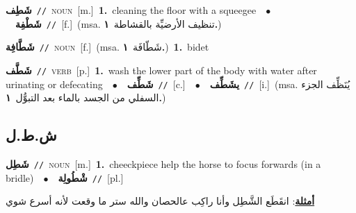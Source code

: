 \documentclass[10pt,a4paper,twoside]{article} %
\begin{document}
\begin{multicols}{2}
{\setlength\topsep{0pt}\textbf{\foreignlanguage{arabic}{شَطِف}}\ {\color{gray}\texttt{//}\color{black}}\ \textsc{noun}\ [m.]\ \textbf{1.}~cleaning the floor with a squeegee\ \ $\bullet$\ \ \setlength\topsep{0pt}\textbf{\foreignlanguage{arabic}{شَطْفِة}}\ {\color{gray}\texttt{//}\color{black}}\ [f.]\ \color{gray}(msa. \foreignlanguage{arabic}{تنظيف الأرضيِّة بالقشاطة}~\foreignlanguage{arabic}{\textbf{١.}})\color{black}\ } \vspace{2mm}

{\setlength\topsep{0pt}\textbf{\foreignlanguage{arabic}{شَطَّافِة}}\ {\color{gray}\texttt{//}\color{black}}\ \textsc{noun}\ [f.]\ \color{gray}(msa. \foreignlanguage{arabic}{شَطّافَة}~\foreignlanguage{arabic}{\textbf{١.}})\color{black}\ \textbf{1.}~bidet\ } \vspace{2mm}

{\setlength\topsep{0pt}\textbf{\foreignlanguage{arabic}{شَطَّف}}\ {\color{gray}\texttt{//}\color{black}}\ \textsc{verb}\ [p.]\ \textbf{1.}~wash the lower part of the body with water after urinating or defecating\ \ $\bullet$\ \ \setlength\topsep{0pt}\textbf{\foreignlanguage{arabic}{شَطِّف}}\ {\color{gray}\texttt{//}\color{black}}\ [c.]\ \ $\bullet$\ \ \setlength\topsep{0pt}\textbf{\foreignlanguage{arabic}{يشَطِّف}}\ {\color{gray}\texttt{//}\color{black}}\ [i.]\ \color{gray}(msa. \foreignlanguage{arabic}{يُنَظِّف الجزء السفلي من الجسد بالماء بعد التبوُّل}~\foreignlanguage{arabic}{\textbf{١.}})\color{black}\ } \vspace{2mm}

\vspace{-3mm}
\subsection*{\color{blue}\foreignlanguage{arabic}{ش.ط.ل}\color{blue}{}} 

{\setlength\topsep{0pt}\textbf{\foreignlanguage{arabic}{شَطِل}}\ {\color{gray}\texttt{//}\color{black}}\ \textsc{noun}\ [m.]\ \textbf{1.}~cheeckpiece help the horse to focus forwards (in a bridle)\ \ $\bullet$\ \ \setlength\topsep{0pt}\textbf{\foreignlanguage{arabic}{شْطُولِة}}\ {\color{gray}\texttt{//}\color{black}}\ [pl.]\  \begin{flushright}\color{gray}\foreignlanguage{arabic}{\textbf{\underline{\foreignlanguage{arabic}{أمثلة}}}: انقَطَع الشَّطِل وأنا راكِب عالحصان والله ستر ما وقعت لأنه أسرع شوي}\end{flushright}\color{black}} \vspace{2mm}


\end{multicols}
\end{document}
